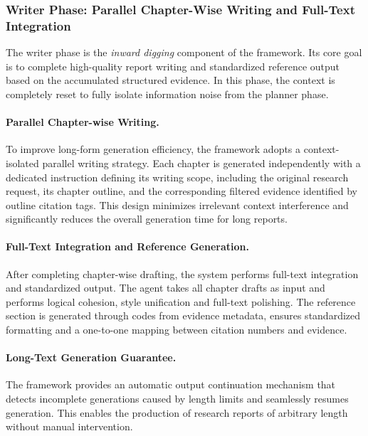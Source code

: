 \documentclass{huawei}
\begin{document}
\subsubsection{Writer Phase: Parallel Chapter-Wise Writing and Full-Text Integration}
The writer phase is the \textit{inward digging} component of the framework. Its core goal is to complete high-quality report writing and standardized reference output based on the accumulated structured evidence. In this phase, the context is completely reset to fully isolate information noise from the planner phase.

\paragraph{Parallel Chapter-wise Writing.}
To improve long-form generation efficiency, the framework adopts a context-isolated parallel writing strategy. 
Each chapter is generated independently with a dedicated instruction defining its writing scope, including the original research request, its chapter outline, and the corresponding filtered evidence identified by outline citation tags. This design minimizes irrelevant context interference and significantly reduces the overall generation time for long reports.

\paragraph{Full-Text Integration and Reference Generation.}
After completing chapter-wise drafting, the system performs full-text integration and standardized output. The agent takes all chapter drafts as input and performs logical cohesion, style unification and full-text polishing. 
The reference section is generated through codes from evidence metadata, ensures standardized formatting and a one-to-one mapping between citation numbers and evidence.

\paragraph{Long-Text Generation Guarantee.}
The framework provides an automatic output continuation mechanism that detects incomplete generations caused by length limits and seamlessly resumes generation. This enables the production of research reports of arbitrary length without manual intervention.


\iffalse
\end{document}
